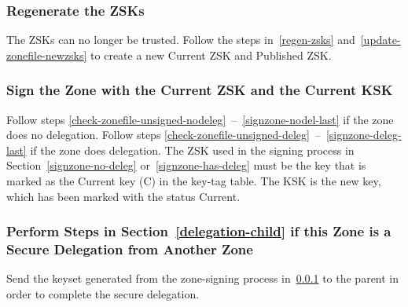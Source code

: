 
\subsubsection{Regenerate the ZSKs}
\label{emerg-regen-zsks}

The ZSKs can no longer be trusted.  Follow the steps in~\ref{regen-zsks}
and~\ref{update-zonefile-newzsks} to create a new Current ZSK and Published
ZSK.


\subsubsection{Sign the Zone with the Current ZSK and the Current KSK}

Follow steps 
\ref{check-zonefile-unsigned-nodeleg}~--~\ref{signzone-nodel-last}   
if the zone does no delegation.  Follow steps
\ref{check-zonefile-unsigned-deleg}~--~\ref{signzone-deleg-last} 
if the zone does delegation.  The ZSK used in the signing process in
Section~\ref{signzone-no-deleg} or~\ref{signzone-has-deleg} must be the key
that is marked as the Current key (C) in the key-tag table.
The KSK is the new key, which has been marked with the
status Current.


\subsubsection{Perform Steps in Section~\ref{delegation-child} if this Zone is a Secure Delegation from Another Zone}

Send the keyset generated from the zone-signing process
in~\ref{emerg-regen-zsks} to the parent in order to complete the secure
delegation.





